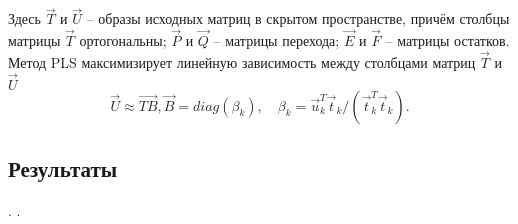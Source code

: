 \documentclass[12pt, twoside]{article}
\begin{document}
Здесь $\vec{T}$ и $\vec{U}$ – образы исходных матриц в скрытом пространстве, причём столбцы матрицы
$\vec{T}$ ортогональны; $\vec{P}$ и $\vec{Q}$ – матрицы перехода; $\vec{E}$ и $\vec{F}$ – матрицы остатков. Метод PLS
максимизирует линейную зависимость между столбцами матриц $\vec{T}$ и $\vec{U}$
\[\vec{U} \approx \vec{TB}, \vec{B} = diag(\beta_k), \quad \beta_k = \vec{u}^T_k 
\vec{t}_k/(\vec{t}^T_k\vec{
t}_k).
\]

\subsection{Результаты}
\newpage
.
\newpage
.
\newpage


\end{document}
